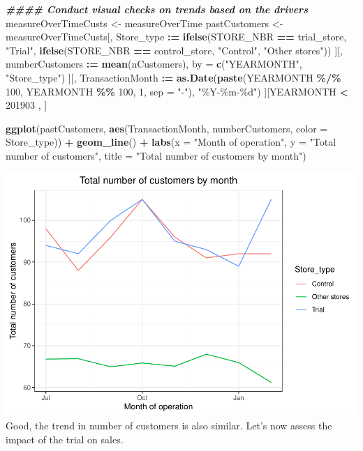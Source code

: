 \documentclass[
]{article}
\newenvironment{Shaded}{\begin{snugshade}}{\end{snugshade}}
\newcommand{\AttributeTok}[1]{\textcolor[rgb]{0.13,0.29,0.53}{#1}}
\newcommand{\DecValTok}[1]{\textcolor[rgb]{0.00,0.00,0.81}{#1}}
\newcommand{\DocumentationTok}[1]{\textcolor[rgb]{0.56,0.35,0.01}{\textbf{\textit{#1}}}}
\newcommand{\FunctionTok}[1]{\textcolor[rgb]{0.13,0.29,0.53}{\textbf{#1}}}
\newcommand{\NormalTok}[1]{#1}
\newcommand{\OtherTok}[1]{\textcolor[rgb]{0.56,0.35,0.01}{#1}}
\newcommand{\SpecialCharTok}[1]{\textcolor[rgb]{0.81,0.36,0.00}{\textbf{#1}}}
\newcommand{\StringTok}[1]{\textcolor[rgb]{0.31,0.60,0.02}{#1}}
\begin{document}
\begin{Shaded}
\begin{Highlighting}[]
\DocumentationTok{\#\#\#\# Conduct visual checks on trends based on the drivers}
\NormalTok{measureOverTimeCusts }\OtherTok{\textless{}{-}}\NormalTok{ measureOverTime}
\NormalTok{pastCustomers }\OtherTok{\textless{}{-}}\NormalTok{ measureOverTimeCusts[, Store\_type }\SpecialCharTok{:=} \FunctionTok{ifelse}\NormalTok{(STORE\_NBR }\SpecialCharTok{==}\NormalTok{ trial\_store, }\StringTok{"Trial"}\NormalTok{,}
\FunctionTok{ifelse}\NormalTok{(STORE\_NBR }\SpecialCharTok{==}\NormalTok{ control\_store, }\StringTok{"Control"}\NormalTok{, }\StringTok{"Other stores"}\NormalTok{))}
\NormalTok{][, numberCustomers }\SpecialCharTok{:=} \FunctionTok{mean}\NormalTok{(nCustomers), by }\OtherTok{=} \FunctionTok{c}\NormalTok{(}\StringTok{"YEARMONTH"}\NormalTok{, }\StringTok{"Store\_type"}\NormalTok{)}
\NormalTok{][, TransactionMonth }\SpecialCharTok{:=} \FunctionTok{as.Date}\NormalTok{(}\FunctionTok{paste}\NormalTok{(YEARMONTH }\SpecialCharTok{\%/\%}
                                        \DecValTok{100}\NormalTok{, YEARMONTH }\SpecialCharTok{\%\%} \DecValTok{100}\NormalTok{, }\DecValTok{1}\NormalTok{, }\AttributeTok{sep =} \StringTok{"{-}"}\NormalTok{), }\StringTok{"\%Y{-}\%m{-}\%d"}\NormalTok{)}
\NormalTok{][YEARMONTH }\SpecialCharTok{\textless{}} \DecValTok{201903}\NormalTok{ , ]}

\FunctionTok{ggplot}\NormalTok{(pastCustomers, }\FunctionTok{aes}\NormalTok{(TransactionMonth, numberCustomers, }\AttributeTok{color =}\NormalTok{ Store\_type)) }\SpecialCharTok{+} 
  \FunctionTok{geom\_line}\NormalTok{() }\SpecialCharTok{+} 
  \FunctionTok{labs}\NormalTok{(}\AttributeTok{x =} \StringTok{"Month of operation"}\NormalTok{, }\AttributeTok{y =} \StringTok{"Total number of customers"}\NormalTok{, }\AttributeTok{title =} \StringTok{"Total number of customers by month"}\NormalTok{)}
\end{Highlighting}
\end{Shaded}

\includegraphics{InsideSherpa_Task2_files/figure-latex/unnamed-chunk-18-1.pdf}
Good, the trend in number of customers is also similar. Let's now assess
the impact of the trial on sales.
\end{document}
